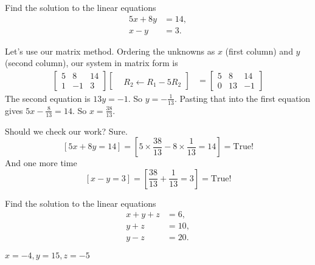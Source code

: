 \documentclass[12pt,fleqn,answers]{exam}
\begin{document}
\begin{questions}
\begin{parts}
\end{parts}



\question [2]  Find the solution to the linear equations
\begin{align*}
   5 x + 8 y &= 14, \\
   x -  y &= 3.
\end{align*}

\begin{solution}[3.0in] Let's use our matrix method. Ordering the unknowns as $x$  (first column) and $y$ (second column), 
   our system in matrix form is
   \begin{align*}
       \begin{bmatrix} 5 & 8 & 14 \\ 1 & -1 & 3 \end{bmatrix}
       \begin{bmatrix}  \\  & R_2 \leftarrow R_1 - 5 R_2 \end{bmatrix}
       &= \begin{bmatrix} 5 & 8 & 14 \\ 0 & 13 & -1 \end{bmatrix}
   \end{align*}
   The second equation is $13 y = -1$. So $y=-\frac{1}{13}$. Pasting that into the 
   first equation gives $5 x - \frac{8}{13} = 14$. So $x = \frac{38}{13}$. 

   Should we check our work?  Sure. 
   \begin{equation*}    
      \left[5 x + 8y = 14\right] = \left[5 \times \frac{38}{13} - 8 \times \frac{1}{13} = 14\right] =
     \mbox{True!}      
   \end{equation*}
   And one more time
   \begin{equation*}    
      \left[x - y = 3\right] = \left[\frac{38}{13}  + \frac{1}{13} = 3 \right] 
      = \mbox{True!}      
   \end{equation*}
\end{solution}

\question [2] Find the solution to the linear equations
\begin{align*}
   x + y + z &= 6, \\
   y + z &= 10,\\
   y - z &= 20.
\end{align*}

\begin{solution}[2.5in]
  $  x=-4,y=15,z=-5$
\end{solution}


\end{questions}
\end{document}
